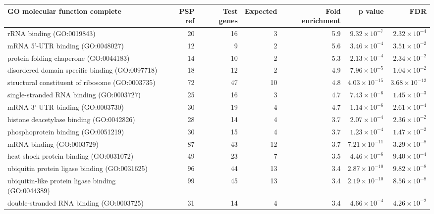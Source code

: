 \begin{table}[ht]
\centering
\begin{adjustbox}{width=\textwidth}


\begin{tabular}{lrrrrrr}
  \hline
GO molecular function complete & PSP ref & Test genes & Expected & Fold enrichment & p value & FDR \\ 
  \hline
rRNA binding (GO:0019843) & 20 & 16 & 3 & 5.9 & $9.32 \times 10^{-7}$ & $2.32 \times 10^{-4}$ \\ 
  mRNA 5'-UTR binding (GO:0048027) & 12 & 9 & 2 & 5.6 & $3.46 \times 10^{-4}$ & $3.51 \times 10^{-2}$ \\ 
  protein folding chaperone (GO:0044183) & 14 & 10 & 2 & 5.3 & $2.13 \times 10^{-4}$ & $2.34 \times 10^{-2}$ \\ 
  disordered domain specific binding (GO:0097718) & 18 & 12 & 2 & 4.9 & $7.96 \times 10^{-5}$ & $1.04 \times 10^{-2}$ \\ 
  structural constituent of ribosome (GO:0003735) & 72 & 47 & 10 & 4.8 & $4.03 \times 10^{-15}$ & $3.68 \times 10^{-12}$ \\ 
  single-stranded RNA binding (GO:0003727) & 25 & 16 & 3 & 4.7 & $7.43 \times 10^{-6}$ & $1.45 \times 10^{-3}$ \\ 
  mRNA 3'-UTR binding (GO:0003730) & 30 & 19 & 4 & 4.7 & $1.14 \times 10^{-6}$ & $2.61 \times 10^{-4}$ \\ 
  histone deacetylase binding (GO:0042826) & 28 & 14 & 4 & 3.7 & $2.07 \times 10^{-4}$ & $2.36 \times 10^{-2}$ \\ 
  phosphoprotein binding (GO:0051219) & 30 & 15 & 4 & 3.7 & $1.23 \times 10^{-4}$ & $1.47 \times 10^{-2}$ \\ 
  mRNA binding (GO:0003729) & 87 & 43 & 12 & 3.7 & $7.21 \times 10^{-11}$ & $3.29 \times 10^{-8}$ \\ 
  heat shock protein binding (GO:0031072) & 49 & 23 & 7 & 3.5 & $4.46 \times 10^{-6}$ & $9.40 \times 10^{-4}$ \\ 
  ubiquitin protein ligase binding (GO:0031625) & 96 & 44 & 13 & 3.4 & $2.87 \times 10^{-10}$ & $9.82 \times 10^{-8}$ \\ 
  ubiquitin-like protein ligase binding (GO:0044389) & 99 & 45 & 13 & 3.4 & $2.19 \times 10^{-10}$ & $8.56 \times 10^{-8}$ \\ 
  double-stranded RNA binding (GO:0003725) & 31 & 14 & 4 & 3.4 & $4.66 \times 10^{-4}$ & $4.26 \times 10^{-2}$ \\ 

\end{tabular}
\end{adjustbox}
\end{table}
